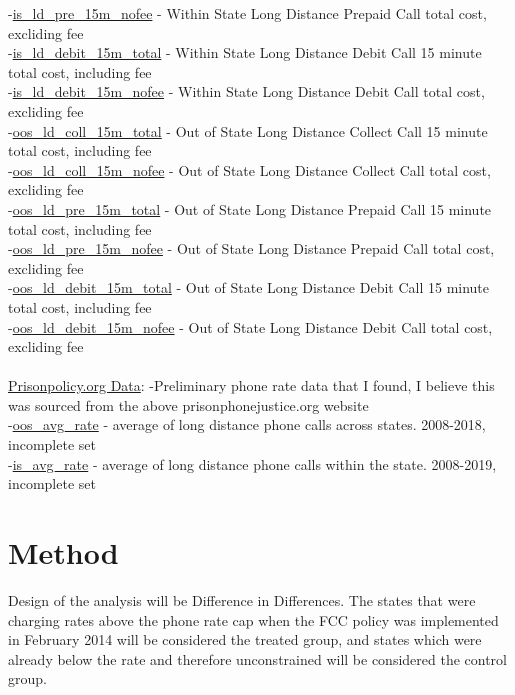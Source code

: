 \documentclass[10pt,a4paper]{article}
\begin{document}
-\underline{is\_ld\_pre\_15m\_nofee} - Within State Long Distance Prepaid Call total cost, excliding fee \\
-\underline{is\_ld\_debit\_15m\_total} - Within State Long Distance Debit Call 15 minute total cost, including fee \\
-\underline{is\_ld\_debit\_15m\_nofee} - Within State Long Distance Debit Call total cost, excliding fee \\
-\underline{oos\_ld\_coll\_15m\_total} - Out of State Long Distance Collect Call 15 minute total cost, including fee \\
-\underline{oos\_ld\_coll\_15m\_nofee} - Out of State Long Distance Collect Call total cost, excliding fee \\
-\underline{oos\_ld\_pre\_15m\_total} - Out of State Long Distance Prepaid Call 15 minute  total cost, including fee \\
-\underline{oos\_ld\_pre\_15m\_nofee} - Out of State Long Distance Prepaid Call total cost, excliding fee \\
-\underline{oos\_ld\_debit\_15m\_total} - Out of State Long Distance Debit Call 15 minute total cost, including fee \\
-\underline{oos\_ld\_debit\_15m\_nofee} - Out of State Long Distance Debit Call total cost, excliding fee \\
\\

\underline{Prisonpolicy.org Data}: 
-Preliminary phone rate data that I found, I believe this was sourced from the above prisonphonejustice.org website \\
-\underline{oos\_avg\_rate} - average of long distance phone calls across states. 2008-2018, incomplete set \\
-\underline{is\_avg\_rate} - average of long distance phone calls within the state. 2008-2019, incomplete set \\





\section{Method}
\noindent Design of the analysis will be Difference in Differences. The states that were charging rates above the phone rate cap when the FCC policy was implemented in February 2014 will be considered the treated group, and states which were already below the rate and therefore unconstrained will be considered the control group.  \\
\end{document}
